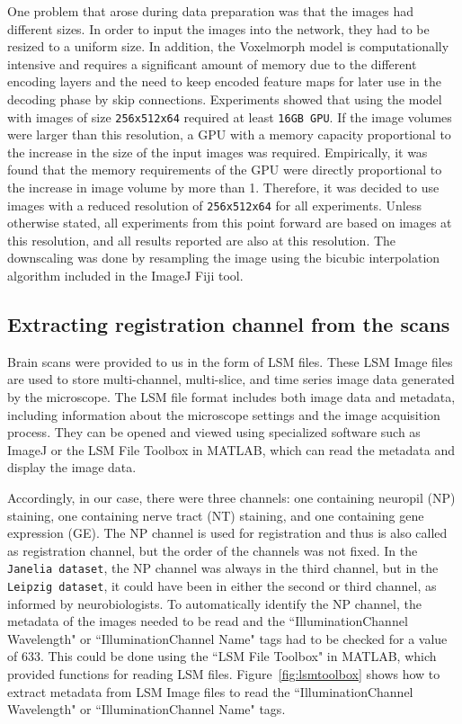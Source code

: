 \documentclass{book}
\begin{document}
	One problem that arose during data preparation was that the images had different sizes. In order to input the images into the network, they had to be resized to a uniform size. In addition, the Voxelmorph model is computationally intensive and requires a significant amount of memory due to the different encoding layers and the need to keep encoded feature maps for later use in the decoding phase by skip connections. Experiments showed that using the model with images of size \texttt{256x512x64} required at least \texttt{16GB GPU}. If the image volumes were larger than this resolution, a GPU with a memory capacity proportional to the increase in the size of the input images was required. Empirically, it was found that the memory requirements of the GPU were directly proportional to the increase in image volume by more than 1. Therefore, it was decided to use images with a reduced resolution of \texttt{256x512x64} for all experiments. Unless otherwise stated, all experiments from this point forward are based on images at this resolution, and all results reported are also at this resolution. The downscaling was done by resampling the image using the bicubic interpolation algorithm included in the ImageJ Fiji tool.
	
	\subsection{Extracting registration channel from the scans}
	
	Brain scans were provided to us in the form of LSM files. These LSM Image files are used to store multi-channel, multi-slice, and time series image data generated by the microscope. The LSM file format includes both image data and metadata, including information about the microscope settings and the image acquisition process. They can be opened and viewed using specialized software such as ImageJ or the LSM File Toolbox in MATLAB, which can read the metadata and display the image data.
	
	Accordingly, in our case, there were three channels: one containing neuropil (NP) staining, one containing nerve tract (NT) staining, and one containing gene expression (GE). The NP channel is used for registration and thus is also called as registration channel, but the order of the channels was not fixed. In the \texttt{Janelia dataset}, the NP channel was always in the third channel, but in the \texttt{Leipzig dataset}, it could have been in either the second or third channel, as informed by neurobiologists. To automatically identify the NP channel, the metadata of the images needed to be read and the ``IlluminationChannel Wavelength" or ``IlluminationChannel Name" tags had to be checked for a value of 633. This could be done using the ``LSM File Toolbox" in MATLAB, which provided functions for reading LSM files. Figure~\ref{fig:lsmtoolbox} shows how to extract metadata from LSM Image files to read the ``IlluminationChannel Wavelength" or ``IlluminationChannel Name" tags. 
	
\end{document}
